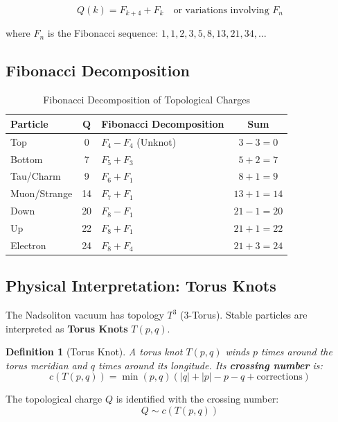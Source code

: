\documentclass[11pt, a4paper]{article}
\newtheorem{definition}{Definition}[section]
\theoremstyle{remark}
\begin{document}
\begin{equation}
Q(k) = F_{k+4} + F_k \quad \text{or variations involving } F_n
\end{equation}

where $F_n$ is the Fibonacci sequence: $1, 1, 2, 3, 5, 8, 13, 21, 34, \ldots$

\subsection{Fibonacci Decomposition}

\begin{table}[H]
\centering
\caption{Fibonacci Decomposition of Topological Charges}
\begin{tabular}{|l|c|l|c|}
\hline
\textbf{Particle} & $\mathbf{Q}$ & \textbf{Fibonacci Decomposition} & \textbf{Sum} \\
\hline
Top & 0 & $F_4 - F_4$ (Unknot) & $3 - 3 = 0$ \\
Bottom & 7 & $F_5 + F_3$ & $5 + 2 = 7$ \\
Tau/Charm & 9 & $F_6 + F_1$ & $8 + 1 = 9$ \\
Muon/Strange & 14 & $F_7 + F_1$ & $13 + 1 = 14$ \\
Down & 20 & $F_8 - F_1$ & $21 - 1 = 20$ \\
Up & 22 & $F_8 + F_1$ & $21 + 1 = 22$ \\
Electron & 24 & $F_8 + F_4$ & $21 + 3 = 24$ \\
\hline
\end{tabular}
\end{table}

\subsection{Physical Interpretation: Torus Knots}

The Nadsoliton vacuum has topology $T^3$ (3-Torus). Stable particles are interpreted as \textbf{Torus Knots} $T(p,q)$.

\begin{definition}[Torus Knot]
A torus knot $T(p,q)$ winds $p$ times around the torus meridian and $q$ times around its longitude. Its \textbf{crossing number} is:
\begin{equation}
c(T(p,q)) = \min(p,q)(|q| + |p| - p - q + \text{corrections})
\end{equation}
\end{definition}

The topological charge $Q$ is identified with the crossing number:
\begin{equation}
Q \sim c(T(p,q))
\end{equation}
\end{document}
